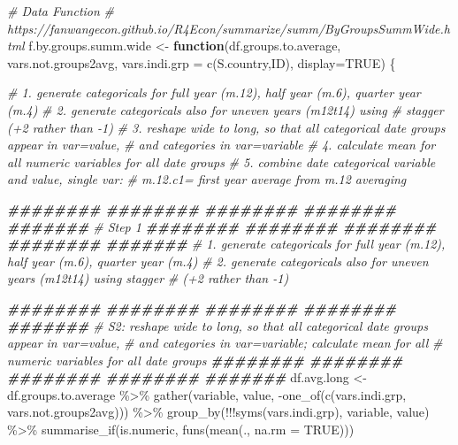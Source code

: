 \documentclass[
]{book}
\newenvironment{Shaded}{\begin{snugshade}}{\end{snugshade}}
\newcommand{\AttributeTok}[1]{\textcolor[rgb]{0.77,0.63,0.00}{#1}}
\newcommand{\CommentTok}[1]{\textcolor[rgb]{0.56,0.35,0.01}{\textit{#1}}}
\newcommand{\ConstantTok}[1]{\textcolor[rgb]{0.00,0.00,0.00}{#1}}
\newcommand{\ControlFlowTok}[1]{\textcolor[rgb]{0.13,0.29,0.53}{\textbf{#1}}}
\newcommand{\DocumentationTok}[1]{\textcolor[rgb]{0.56,0.35,0.01}{\textbf{\textit{#1}}}}
\newcommand{\FunctionTok}[1]{\textcolor[rgb]{0.00,0.00,0.00}{#1}}
\newcommand{\NormalTok}[1]{#1}
\newcommand{\OtherTok}[1]{\textcolor[rgb]{0.56,0.35,0.01}{#1}}
\newcommand{\SpecialCharTok}[1]{\textcolor[rgb]{0.00,0.00,0.00}{#1}}
\newcommand{\StringTok}[1]{\textcolor[rgb]{0.31,0.60,0.02}{#1}}
\begin{document}
\begin{Shaded}
\begin{Highlighting}[]
\CommentTok{\# Data Function}
\CommentTok{\# https://fanwangecon.github.io/R4Econ/summarize/summ/ByGroupsSummWide.html}
\NormalTok{f.by.groups.summ.wide }\OtherTok{\textless{}{-}} \ControlFlowTok{function}\NormalTok{(df.groups.to.average,}
\NormalTok{                                  vars.not.groups2avg,}
                                  \AttributeTok{vars.indi.grp =} \FunctionTok{c}\NormalTok{(}\StringTok{\textquotesingle{}S.country\textquotesingle{}}\NormalTok{,}\StringTok{\textquotesingle{}ID\textquotesingle{}}\NormalTok{),}
                                  \AttributeTok{display=}\ConstantTok{TRUE}\NormalTok{) \{}

\CommentTok{\# 1. generate categoricals for full year (m.12), half year (m.6), quarter year (m.4)}
\CommentTok{\# 2. generate categoricals also for uneven years (m12t14) using }
\CommentTok{\#  stagger (+2 rather than {-}1)}
\CommentTok{\# 3. reshape wide to long, so that all categorical date groups appear in var=value,}
    \CommentTok{\# and categories in var=variable}
\CommentTok{\# 4. calculate mean for all numeric variables for all date groups}
\CommentTok{\# 5. combine date categorical variable and value, single var:}
    \CommentTok{\# m.12.c1= first year average from m.12 averaging}

\DocumentationTok{\#\#\#\#\#\#\#\# \#\#\#\#\#\#\#\# \#\#\#\#\#\#\#\# \#\#\#\#\#\#\#\# \#\#\#\#\#\#\#}
\CommentTok{\# Step 1}
\DocumentationTok{\#\#\#\#\#\#\#\# \#\#\#\#\#\#\#\# \#\#\#\#\#\#\#\# \#\#\#\#\#\#\#\# \#\#\#\#\#\#\#}
\CommentTok{\# 1. generate categoricals for full year (m.12), half year (m.6), quarter year (m.4)}
\CommentTok{\# 2. generate categoricals also for uneven years (m12t14) using stagger }
\CommentTok{\#  (+2 rather than {-}1)}

\DocumentationTok{\#\#\#\#\#\#\#\# \#\#\#\#\#\#\#\# \#\#\#\#\#\#\#\# \#\#\#\#\#\#\#\# \#\#\#\#\#\#\#}
\CommentTok{\# S2: reshape wide to long, so that all categorical date groups appear in var=value,}
\CommentTok{\# and categories in var=variable; calculate mean for all }
\CommentTok{\# numeric variables for all date groups}
\DocumentationTok{\#\#\#\#\#\#\#\# \#\#\#\#\#\#\#\# \#\#\#\#\#\#\#\# \#\#\#\#\#\#\#\# \#\#\#\#\#\#\#}
\NormalTok{df.avg.long }\OtherTok{\textless{}{-}}\NormalTok{ df.groups.to.average }\SpecialCharTok{\%\textgreater{}\%}
       \FunctionTok{gather}\NormalTok{(variable, value, }\SpecialCharTok{{-}}\FunctionTok{one\_of}\NormalTok{(}\FunctionTok{c}\NormalTok{(vars.indi.grp,}
\NormalTok{                                         vars.not.groups2avg))) }\SpecialCharTok{\%\textgreater{}\%}
       \FunctionTok{group\_by}\NormalTok{(}\SpecialCharTok{!!!}\FunctionTok{syms}\NormalTok{(vars.indi.grp), variable, value) }\SpecialCharTok{\%\textgreater{}\%}
       \FunctionTok{summarise\_if}\NormalTok{(is.numeric, }\FunctionTok{funs}\NormalTok{(}\FunctionTok{mean}\NormalTok{(., }\AttributeTok{na.rm =} \ConstantTok{TRUE}\NormalTok{)))}


\end{Highlighting}
\end{Shaded}
\end{document}
